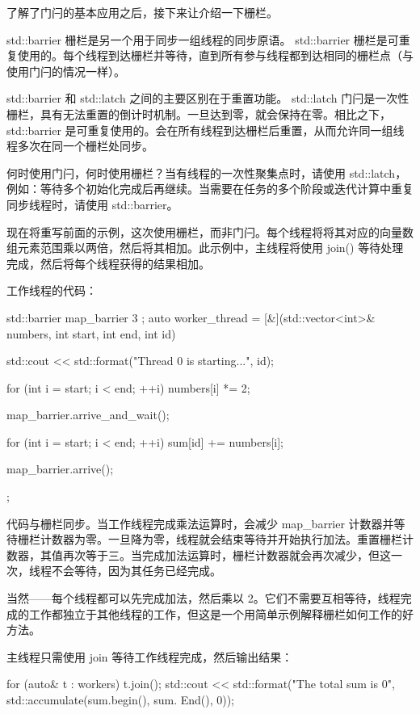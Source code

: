 了解了门闩的基本应用之后，接下来让介绍一下栅栏。


std::barrier 栅栏是另一个用于同步一组线程的同步原语。 std::barrier 栅栏是可重复使用的。每个线程到达栅栏并等待，直到所有参与线程都到达相同的栅栏点（与使用门闩的情况一样）。

std::barrier 和 std::latch 之间的主要区别在于重置功能。 std::latch 门闩是一次性栅栏，具有无法重置的倒计时机制。一旦达到零，就会保持在零。相比之下， std::barrier 是可重复使用的。会在所有线程到达栅栏后重置，从而允许同一组线程多次在同一个栅栏处同步。

何时使用门闩，何时使用栅栏？当有线程的一次性聚集点时，请使用 std::latch，例如：等待多个初始化完成后再继续。当需要在任务的多个阶段或迭代计算中重复同步线程时，请使用 std::barrier。

现在将重写前面的示例，这次使用栅栏，而非门闩。每个线程将将其对应的向量数组元素范围乘以两倍，然后将其相加。此示例中，主线程将使用 join() 等待处理完成，然后将每个线程获得的结果相加。

工作线程的代码：

\begin{cpp}
std::barrier map_barrier{ 3 };
auto worker_thread = [&](std::vector<int>& numbers, int start, int
end, int id) {
    std::cout << std::format("Thread {0} is starting...\n", id);

    for (int i = start; i < end; ++i) {
        numbers[i] *= 2;
    }

    map_barrier.arrive_and_wait();

    for (int i = start; i < end; ++i) {
        sum[id] += numbers[i];
    }

    map_barrier.arrive();
};
\end{cpp}

代码与栅栏同步。当工作线程完成乘法运算时，会减少 map\_barrier 计数器并等待栅栏计数器为零。一旦降为零，线程就会结束等待并开始执行加法。重置栅栏计数器，其值再次等于三。当完成加法运算时，栅栏计数器就会再次减少，但这一次，线程不会等待，因为其任务已经完成。

当然——每个线程都可以先完成加法，然后乘以 2。它们不需要互相等待，线程完成的工作都独立于其他线程的工作，但这是一个用简单示例解释栅栏如何工作的好方法。

主线程只需使用 join 等待工作线程完成，然后输出结果：

\begin{cpp}
for (auto& t : workers) {
    t.join();
}
std::cout << std::format("The total sum is {0}\n",
                         std::accumulate(sum.begin(), sum. End(), 0));
\end{cpp}

